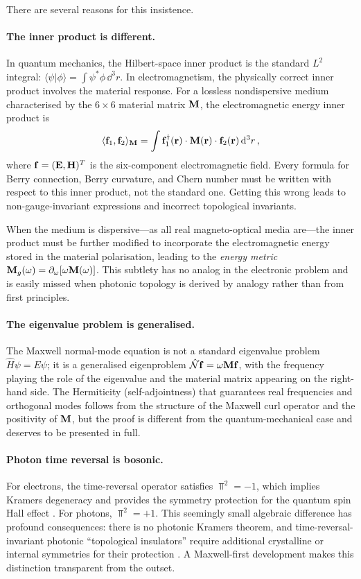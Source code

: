 There are several reasons for this insistence.

\paragraph{The inner product is different.}
In quantum mechanics, the Hilbert-space inner product is the standard
$L^2$ integral: $\langle\psi|\phi\rangle=\int\psi^*\phi\,\dd^3 r$.
In electromagnetism, the physically correct inner product involves the
material response.  For a lossless nondispersive medium characterised by
the $6\times 6$ material matrix $\mathbf{M}$, the electromagnetic energy
inner product is
\begin{equation}\label{eq:ch1-em-inner-product}
  \langle \mathbf{f}_1 , \mathbf{f}_2 \rangle_{\mathbf{M}}
  = \int \mathbf{f}_1^\dagger(\mathbf{r})\cdot \mathbf{M}(\mathbf{r})\cdot
         \mathbf{f}_2(\mathbf{r})\,\mathrm{d}^3 r\,,
\end{equation}
where $\mathbf{f} = (\mathbf{E},\mathbf{H})^T$ is the six-component
electromagnetic field.  Every formula for Berry connection, Berry
curvature, and Chern number must be written with respect to this inner
product, not the standard one.  Getting this wrong leads to
non-gauge-invariant expressions and incorrect topological invariants.

When the medium is dispersive---as all real magneto-optical media
are---the inner product must be further modified to incorporate the
electromagnetic energy stored in the material polarisation, leading to
the \emph{energy metric}
$\mathbf{M}_g(\omega)=\partial_\omega[\omega\mathbf{M}(\omega)]$.  This
subtlety has no analog in the electronic problem and is easily missed
when photonic topology is derived by analogy rather than from first
principles.

\paragraph{The eigenvalue problem is generalised.}
The Maxwell normal-mode equation is not a standard eigenvalue problem
$\hat{H}\psi=E\psi$; it is a generalised eigenproblem
$\hat{\mathcal{N}}\mathbf{f}=\omega\mathbf{M}\mathbf{f}$, with the frequency playing the
role of the eigenvalue and the material matrix appearing on the
right-hand side.  The Hermiticity (self-adjointness) that guarantees
real frequencies and orthogonal modes follows from the structure of the
Maxwell curl operator and the positivity of $\mathbf{M}$, but the proof is
different from the quantum-mechanical case and deserves to be presented
in full.

\paragraph{Photon time reversal is bosonic.}
For electrons, the time-reversal operator satisfies $\Top^2=-1$, which
implies Kramers degeneracy and provides the symmetry protection for the
quantum spin Hall effect
\cite{kane2005sub}.  For photons, $\Top^2=+1$.  This seemingly
small algebraic difference has profound consequences: there is no
photonic Kramers theorem, and time-reversal-invariant photonic
``topological insulators'' require additional crystalline or internal
symmetries for their protection
\cite{hsieh2008topological}.  A Maxwell-first development makes this
distinction transparent from the outset.


